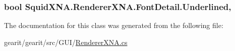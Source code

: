 \hypertarget{class_squid_x_n_a_1_1_renderer_x_n_a_1_1_font_detail_a6eb6a3f90ca4cbc408364101df6d0bc4}{
\subsubsection[{Underlined}]{\setlength{\rightskip}{0pt plus 5cm}bool Squid\+X\+N\+A.\+Renderer\+X\+N\+A.\+Font\+Detail.\+Underlined\hspace{0.3cm}{\ttfamily [get]}, {\ttfamily [set]}}}\label{class_squid_x_n_a_1_1_renderer_x_n_a_1_1_font_detail_a6eb6a3f90ca4cbc408364101df6d0bc4}


The documentation for this class was generated from the following file\+:\begin{DoxyCompactItemize}
\item 
gearit/gearit/src/\+G\+U\+I/\hyperlink{_renderer_x_n_a_8cs}{Renderer\+X\+N\+A.\+cs}\end{DoxyCompactItemize}
